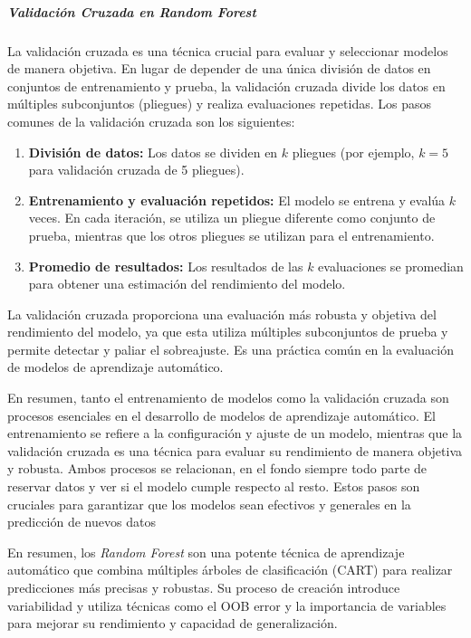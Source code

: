 \subparagraph{Validación Cruzada en \textit{Random Forest}}

La validación cruzada es una técnica crucial para evaluar y seleccionar modelos de manera objetiva. En lugar de depender de una única división de datos en conjuntos de entrenamiento y prueba, la validación cruzada divide los datos en múltiples subconjuntos (pliegues) y realiza evaluaciones repetidas. Los pasos comunes de la validación cruzada son los siguientes:

\begin{enumerate}
  \item \textbf{División de datos:} Los datos se dividen en $k$ pliegues (por ejemplo, $k=5$ para validación cruzada de 5 pliegues).
  
  \item \textbf{Entrenamiento y evaluación repetidos:} El modelo se entrena y evalúa $k$ veces. En cada iteración, se utiliza un pliegue diferente como conjunto de prueba, mientras que los otros pliegues se utilizan para el entrenamiento.
  
  \item \textbf{Promedio de resultados:} Los resultados de las $k$ evaluaciones se promedian para obtener una estimación del rendimiento del modelo.
\end{enumerate}

La validación cruzada proporciona una evaluación más robusta y objetiva del rendimiento del modelo, ya que esta utiliza múltiples subconjuntos de prueba y permite detectar y paliar el sobreajuste. Es una práctica común en la evaluación de modelos de aprendizaje automático.

En resumen, tanto el entrenamiento de modelos como la validación cruzada son procesos esenciales en el desarrollo de modelos de aprendizaje automático. El entrenamiento se refiere a la configuración y ajuste de un modelo, mientras que la validación cruzada es una técnica para evaluar su rendimiento de manera objetiva y robusta. Ambos procesos se relacionan, en el fondo siempre todo parte de reservar datos y ver si el modelo cumple respecto al resto. Estos pasos son cruciales para garantizar que los modelos sean efectivos y generales en la predicción de nuevos datos


\vspace{10pt}

En resumen, los \textit{Random Forest} son una potente técnica de aprendizaje automático que combina múltiples árboles de clasificación (CART) para realizar predicciones más precisas y robustas. Su proceso de creación introduce variabilidad y utiliza técnicas como el OOB error y la importancia de variables para mejorar su rendimiento y capacidad de generalización.


